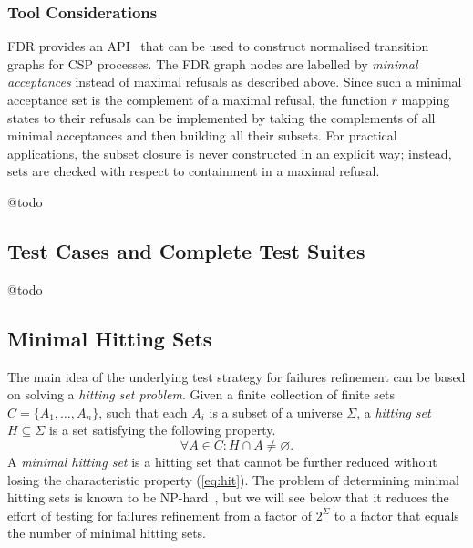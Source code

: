 \subsubsection*{Tool Considerations}
FDR provides an API~\cite{fdrmanual} that can be used to construct normalised
transition graphs for CSP processes. The FDR graph nodes are labelled by
\emph{minimal acceptances} instead of maximal refusals as described above.
Since such a minimal acceptance set is the complement of a maximal refusal,
the function $r$ mapping states to their refusals can be implemented by
taking the complements of all minimal acceptances and then building all their
subsets. For practical applications, the subset closure is never constructed
in an explicit way; instead, sets are checked with respect to containment in
a maximal refusal.

@todo


\subsection{Test Cases and Complete Test Suites}
\label{sec:cspcompletedef}

@todo

\subsection{Minimal Hitting Sets}
\label{sec:hit}

The main idea of the underlying test strategy for failures refinement can be
based on solving a \emph{hitting set problem}. Given a finite collection of
finite sets $C = \{ A_1,\dots,A_n\}$, such that each $A_i$ is a subset of a
universe $\Sigma$, a \emph{hitting set} $H\subseteq\Sigma$ is a set
satisfying the following property.
%
\begin{equation}
  \label{eq:hit}
  \forall A\in C: H\cap A \neq\varnothing.
\end{equation}
%
A \emph{minimal hitting set} is a hitting set that cannot be further reduced
without losing the characteristic property (\ref{eq:hit}). The problem of
determining minimal hitting sets is known to be
NP-hard~\cite{Book1975-BOOKRM}, but we will see below that it reduces the
effort of testing for failures refinement from a factor of $2^\Sigma$ to a
factor that equals the number of minimal hitting sets.

